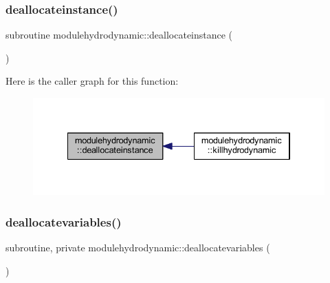 \subsubsection{\texorpdfstring{deallocateinstance()}{deallocateinstance()}}
{\footnotesize\ttfamily subroutine modulehydrodynamic\+::deallocateinstance (\begin{DoxyParamCaption}{ }\end{DoxyParamCaption})\hspace{0.3cm}{\ttfamily [private]}}

Here is the caller graph for this function\+:\nopagebreak
\begin{figure}[H]
\begin{center}
\leavevmode
\includegraphics[width=334pt]{namespacemodulehydrodynamic_aabd13dda5e1f35caf879873becb922c4_icgraph}
\end{center}
\end{figure}
\mbox{\label{namespacemodulehydrodynamic_a97e376130dedc4213ae9f7bd331d237a}} 
\subsubsection{\texorpdfstring{deallocatevariables()}{deallocatevariables()}}
{\footnotesize\ttfamily subroutine, private modulehydrodynamic\+::deallocatevariables (\begin{DoxyParamCaption}{ }\end{DoxyParamCaption})\hspace{0.3cm}{\ttfamily [private]}}

